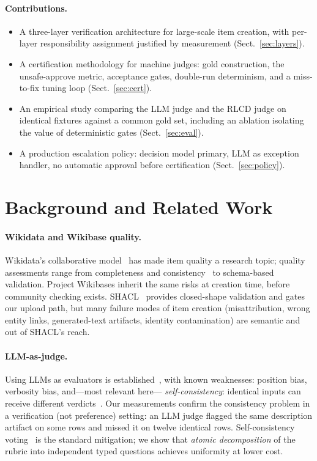 \documentclass{llncs}
\begin{document}
\paragraph{Contributions.}
\begin{itemize}
\item A three-layer verification architecture for large-scale item
  creation, with per-layer responsibility assignment justified by
  measurement (Sect.~\ref{sec:layers}).
\item A certification methodology for machine judges: gold construction,
  the unsafe-approve metric, acceptance gates, double-run determinism, and
  a miss-to-fix tuning loop (Sect.~\ref{sec:cert}).
\item An empirical study comparing the LLM judge and the RLCD judge on
  identical fixtures against a common gold set, including an ablation
  isolating the value of deterministic gates (Sect.~\ref{sec:eval}).
\item A production escalation policy: decision model primary, LLM as
  exception handler, no automatic approval before certification
  (Sect.~\ref{sec:policy}).
\end{itemize}

\section{Background and Related Work}
\label{sec:related}

\paragraph{Wikidata and Wikibase quality.}
Wikidata's collaborative model~\cite{vrandecic2014wikidata} has made item
quality a research topic; quality assessments range from completeness and
consistency~\cite{piscopo2019quality} to schema-based validation. Project
Wikibases inherit the same risks at creation time, before community
checking exists. SHACL~\cite{knublauch2017shacl} provides closed-shape
validation and gates our upload path, but many failure modes of item
creation (misattribution, wrong entity links, generated-text artifacts,
identity contamination) are semantic and out of SHACL's reach.

\paragraph{LLM-as-judge.}
Using LLMs as evaluators is established~\cite{zheng2023judging}, with known
weaknesses: position bias, verbosity bias, and---most relevant here---%
\emph{self-consistency}: identical inputs can receive different
verdicts~\cite{wang2022selfconsistency}. Our measurements confirm the
consistency problem in a verification (not preference) setting: an LLM
judge flagged the same description artifact on some rows and missed it on
twelve identical rows. Self-consistency voting~\cite{wang2022selfconsistency}
is the standard mitigation; we show that \emph{atomic decomposition} of the
rubric into independent typed questions achieves uniformity at lower cost.
\end{document}
